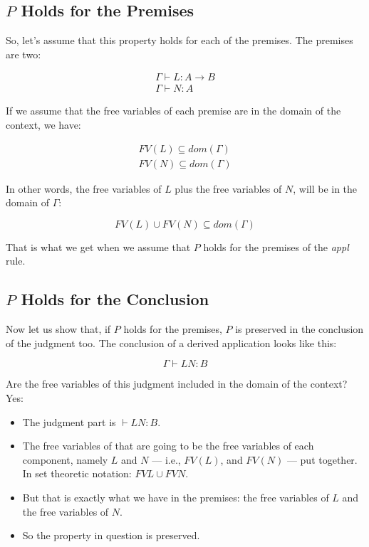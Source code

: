 \documentclass{book}
\numberwithin{equation}{chapter}
\begin{document}
\subsection{$P$ Holds for the Premises}

So, let's assume that this property holds for each of the premises. The premises are two:

\begin{align*}
\Gamma \vdash L : A \rightarrow B \\
\Gamma \vdash N : A
\end{align*}

\noindent
If we assume that the free variables of each premise are in the domain of the context, we have:

\begin{align*}
FV(L) \subseteq dom(\Gamma) \\
FV(N) \subseteq dom(\Gamma)
\end{align*}

\noindent
In other words, the free variables of $L$ plus the free variables of $N$, will be in the domain of $\Gamma$:

\begin{equation*}
FV(L) \cup FV(N) \subseteq dom(\Gamma)
\end{equation*}

\noindent
That is what we get when we assume that $P$ holds for the premises of the \textit{appl} rule.


\subsection{$P$ Holds for the Conclusion}

Now let us show that, if $P$ holds for the premises, $P$ is preserved in the conclusion of the judgment too. The conclusion of a derived application looks like this:

\begin{equation*}
\Gamma \vdash LN : B
\end{equation*}

\noindent
Are the free variables of this judgment included in the domain of the context? Yes:

\begin{itemize}
\item{The judgment part is $\vdash LN : B$.}
\item{The free variables of that are going to be the free variables of each component, namely $L$ and $N$ --- i.e., $FV(L)$, and $FV(N)$ --- put together. In set theoretic notation: $FV{L} \cup FV{N}$.}
\item{But that is exactly what we have in the premises: the free variables of $L$ and the free variables of $N$.}
\item{So the property in question is preserved.}
\end{itemize}
\end{document}

